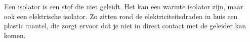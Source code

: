 Een isolator is een stof die niet geleidt. Het kan een warmte isolator zijn, maar ook een elektrische isolator. Zo zitten rond de elektriciteitsdraden in huis een plastic mantel, die zorgt ervoor dat je niet in direct contact met de geleider kan komen.
